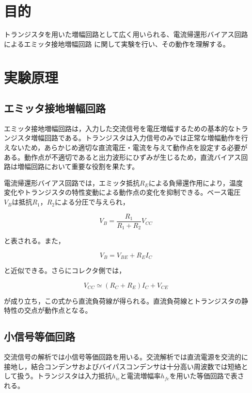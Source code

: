 \documentclass[11pt,a4paper]{jsarticle}
\begin{document}
\section{目的}
トランジスタを用いた増幅回路として広く用いられる、電流帰還形バイアス回路によるエミッタ接地増幅回路
に関して実験を行い、その動作を理解する。

\section{実験原理}

\subsection{エミッタ接地増幅回路}

エミッタ接地増幅回路は，入力した交流信号を電圧増幅するための基本的なトランジスタ増幅回路である。トランジスタは入力信号のみでは正常な増幅動作を行えないため，あらかじめ適切な直流電圧・電流を与えて動作点を設定する必要がある。動作点が不適切であると出力波形にひずみが生じるため，直流バイアス回路は増幅回路において重要な役割を果たす。

電流帰還形バイアス回路では，エミッタ抵抗$R_E$による負帰還作用により，温度変化やトランジスタの特性変動による動作点の変化を抑制できる。ベース電圧$V_B$は抵抗$R_1$，$R_2$による分圧で与えられ，

\begin{equation}
V_B=\frac{R_1}{R_1+R_2}V_{CC}
\end{equation}

と表される。また，

\begin{equation}
V_B=V_{BE}+R_EI_C
\end{equation}

と近似できる。さらにコレクタ側では，

\begin{equation}
V_{CC}\simeq(R_C+R_E)I_C+V_{CE}
\end{equation}

が成り立ち，この式から直流負荷線が得られる。直流負荷線とトランジスタの静特性の交点が動作点となる。

\subsection{小信号等価回路}

交流信号の解析では小信号等価回路を用いる。交流解析では直流電源を交流的に接地し，結合コンデンサおよびバイパスコンデンサは十分高い周波数では短絡として扱う。トランジスタは入力抵抗$h_{ie}$と電流増幅率$h_{fe}$を用いた等価回路で表される。
\end{document}
